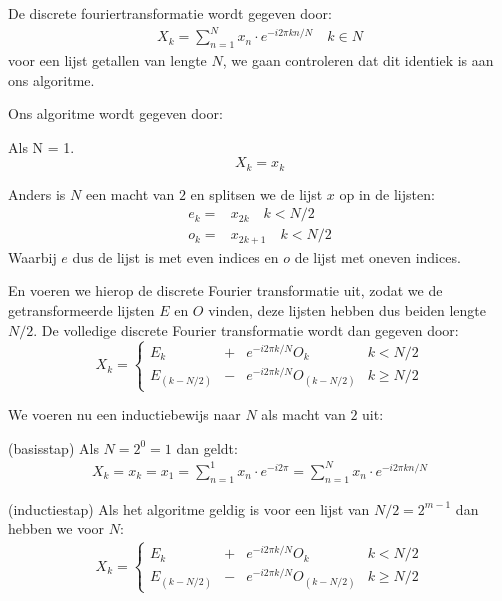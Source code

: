 \documentclass[11pt]{article}
\newcommand{\eq}[1]{\begin{eqnarray*} #1 \end{eqnarray*}}
\begin{document}
De discrete fouriertransformatie wordt gegeven door:
\eq{
 X_k = \sum^N_{n=1} x_n \cdot e^{-i2\pi k n/N} \quad k\in N
}
voor een lijst getallen van lengte $N$, we gaan controleren dat 
dit identiek is aan ons algoritme.

Ons algoritme wordt gegeven door:

Als N = 1.
\[
  X_k = x_k
\]

Anders is $N$ een macht van $2$ en splitsen we de lijst $x$ op in de lijsten:
\eq{
  e_k   =& x_{2k}  \quad k < N/2\\
  o_k =& x_{2k+1} \quad k < N/2
}
Waarbij $e$ dus de lijst is met even indices en $o$ de lijst met oneven indices.

En voeren we hierop de discrete Fourier transformatie uit, zodat we de getransformeerde lijsten
$E$ en $O$ vinden, deze lijsten hebben dus beiden lengte $N/2$.
De volledige discrete Fourier transformatie wordt dan gegeven door:
\[
  X_k = \left\{\begin{array}{llll}
    E_k         &+& e^{-i2\pi k/N} O_k &  k< N/2 \\
    E_{(k-N/2)} &-& e^{-i2\pi k/N} O_{(k-N/2)} &  k\geq N/2 
  \end{array}\right.
\]

We voeren nu een inductiebewijs naar $N$ als macht van $2$ uit:

(basisstap) Als $N=2^0=1$ dan geldt:
\eq{
  X_k = x_k = x_1 = \sum_{n=1}^{1} x_n \cdot e^{-i2\pi} = \sum_{n=1}^{N} x_n \cdot e^{-i2\pi k n /N}
}

(inductiestap) Als het algoritme geldig is voor een lijst van $N/2 = 2^{m-1}$ dan hebben we voor $N$:
\eq{
  X_k = \left\{\begin{array}{llll}
    E_k         &+& e^{-i2\pi k/N} O_k &  k< N/2 \\
    E_{(k-N/2)} &-& e^{-i2\pi k/N} O_{(k-N/2)} &  k\geq N/2 
  \end{array}\right.
}
\end{document}
